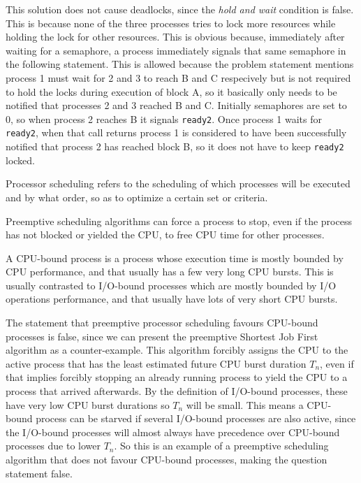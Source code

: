 \documentclass{sope}
\begin{document}
{
This solution does not cause deadlocks, since the \emph{hold and wait} condition is false. This is because none of the three processes tries to lock more resources while holding the lock for other resources. This is obvious because, immediately after waiting for a semaphore, a process immediately signals that same semaphore in the following statement. This is allowed because the problem statement mentions process 1 must wait for 2 and 3 to reach B and C respecively but is not required to hold the locks during execution of block A, so it basically only needs to be notified that processes 2 and 3 reached B and C. Initially semaphores are set to 0, so when process 2 reaches B it signals \texttt{ready2}. Once process 1 waits for \texttt{ready2}, when that call returns process 1 is considered to have been successfully notified that process 2 has reached block B, so it does not have to keep \texttt{ready2} locked.

Processor scheduling refers to the scheduling of which processes will be executed and by what order, so as to optimize a certain set or criteria.

Preemptive scheduling algorithms can force a process to stop, even if the process has not blocked or yielded the CPU, to free CPU time for other processes.

A CPU-bound process is a process whose execution time is mostly bounded by CPU performance, and that usually has a few very long CPU bursts. This is usually contrasted to I/O-bound processes which are mostly bounded by I/O operations performance, and that usually have lots of very short CPU bursts.

The statement that preemptive processor scheduling favours CPU-bound processes is false, since we can present the preemptive Shortest Job First algorithm as a counter-example. This algorithm forcibly assigns the CPU to the active process that has the least estimated future CPU burst duration $T_n$, even if that implies forcibly stopping an already running process to yield the CPU to a process that arrived afterwards. By the definition of I/O-bound processes, these have very low CPU burst durations so $T_n$ will be small. This means a CPU-bound process can be starved if several I/O-bound processes are also active, since the I/O-bound processes will almost always have precedence over CPU-bound processes due to lower $T_n$. So this is an example of a preemptive scheduling algorithm that does not favour CPU-bound processes, making the question statement false.

}
\end{document}
